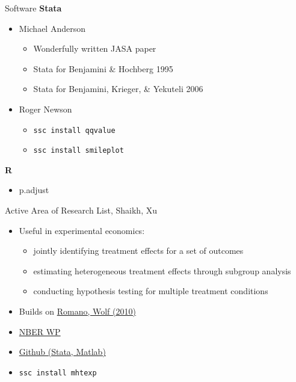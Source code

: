 \documentclass{beamer}
\begin{document}
\begin{frame}{Software}
\textbf{Stata}
\begin{itemize}
\item Michael Anderson
\begin{itemize}
\item Wonderfully written JASA paper \href{https://are.berkeley.edu/~mlanderson/pdf/Anderson\%202008a.pdf}{}
\item Stata for Benjamini \& Hochberg 1995 \href{http://are.berkeley.edu/~mlanderson/downloads/fdr_qvalues.do.zip}{}
\item Stata for Benjamini, Krieger, \& Yekuteli 2006 \href{http://are.berkeley.edu/~mlanderson/downloads/fdr\_sharpened\_qvalues.do.zip}{}
\end{itemize}
\item Roger Newson
\begin{itemize}
\item \texttt{ssc install qqvalue} \href{http://www.stata-journal.com/sjpdf.html?articlenum=st0209}{}
\item \texttt{ssc install smileplot} \href{http://www.stata-journal.com/sjpdf.html?articlenum=st0035}{}
\end{itemize}
\end{itemize}
\textbf{R}
\begin{itemize}
\item p.adjust \href{https://www.rdocumentation.org/packages/stats/versions/3.4.3/topics/p.adjust}{}
\end{itemize}
\end{frame}

\begin{frame}{Active Area of Research}
List, Shaikh, Xu
\begin{itemize}
\item Useful in experimental economics:
\begin{itemize}
\item jointly identifying treatment effects for a set of outcomes
\item estimating heterogeneous treatment effects through subgroup analysis
\item conducting hypothesis testing for multiple treatment conditions
\end{itemize}
\item Builds on \href{https://projecteuclid.org/download/pdfview_1/euclid.aos/1262271625}{Romano, Wolf (2010)}
\item \href{http://www.nber.org/papers/w21875}{NBER WP}
\item \href{https://github.com/seidelj/mht}{Github (Stata, Matlab)}
\item \texttt{ssc install mhtexp}
\end{itemize}
\end{frame}
\end{document}
